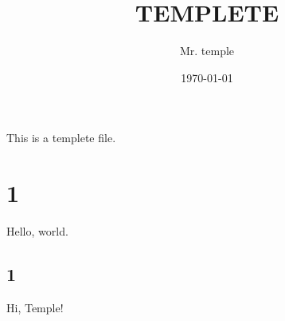 \documentclass{jsarticle}
\begin{document}
\title{TEMPLETE}
\author{Mr. temple}
\date{\today}
\maketitle


\section*{}
This is a templete file.

 \section*{1}
Hello, world.
\subsection*{1}
Hi, Temple!
\end{document}

